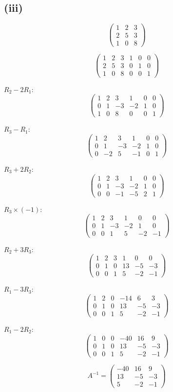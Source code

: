 \subsection*{(iii)}
\[
	\begin{pmatrix}
		1 & 2 & 3 \\
		2 & 5 & 3 \\
		1 & 0 & 8
	\end{pmatrix}
\]

\[
	\begin{pmatrix}
		1 & 2 & 3 & 1 & 0 & 0 \\
		2 & 5 & 3 & 0 & 1 & 0 \\
		1 & 0 & 8 & 0 & 0 & 1
	\end{pmatrix}
\]

$R_2 - 2R_1$:
\[
	\begin{pmatrix}
		1 & 2  & 3  & 1  & 0 & 0 \\
		0 & 1  & -3 & -2 & 1 & 0 \\
		1 & 0 & 8 & 0 & 0 & 1
	\end{pmatrix}
\]

$R_3 - R_1$:
\[
	\begin{pmatrix}
		1 & 2  & 3  & 1  & 0 & 0 \\
		0 & 1  & -3 & -2 & 1 & 0 \\
		0 & -2 & 5  & -1 & 0 & 1
	\end{pmatrix}
\]

$R_3 + 2R_2$:
\[
	\begin{pmatrix}
		1 & 2 & 3  & 1  & 0 & 0 \\
		0 & 1 & -3 & -2 & 1 & 0 \\
		0 & 0 & -1 & -5 & 2 & 1
	\end{pmatrix}
\]

$R_3 \times (-1)$:
\[
	\begin{pmatrix}
		1 & 2 & 3  & 1  & 0  & 0  \\
		0 & 1 & -3 & -2 & 1  & 0  \\
		0 & 0 & 1  & 5  & -2 & -1
	\end{pmatrix}
\]

$R_2 + 3R_3$:
\[
	\begin{pmatrix}
		1 & 2 & 3 & 1 & 0  & 0  \\
		0 & 1 & 0 & 13  & -5 & -3 \\
		0 & 0 & 1  & 5  & -2 & -1
	\end{pmatrix}
\]

$R_1 - 3R_3$:
\[
	\begin{pmatrix}
		1 & 2 & 0 & -14 & 6  & 3  \\
		0 & 1 & 0 & 13  & -5 & -3 \\
		0 & 0 & 1 & 5   & -2 & -1
	\end{pmatrix}
\]

$R_1 - 2R_2$:
\[
	\begin{pmatrix}
		1 & 0 & 0 & -40 & 16 & 9  \\
		0 & 1 & 0 & 13  & -5 & -3 \\
		0 & 0 & 1 & 5   & -2 & -1
	\end{pmatrix}
\]

\[
	A^{-1} = \begin{pmatrix}
		-40 & 16 & 9  \\
		13  & -5 & -3 \\
		5   & -2 & -1
	\end{pmatrix}
\]